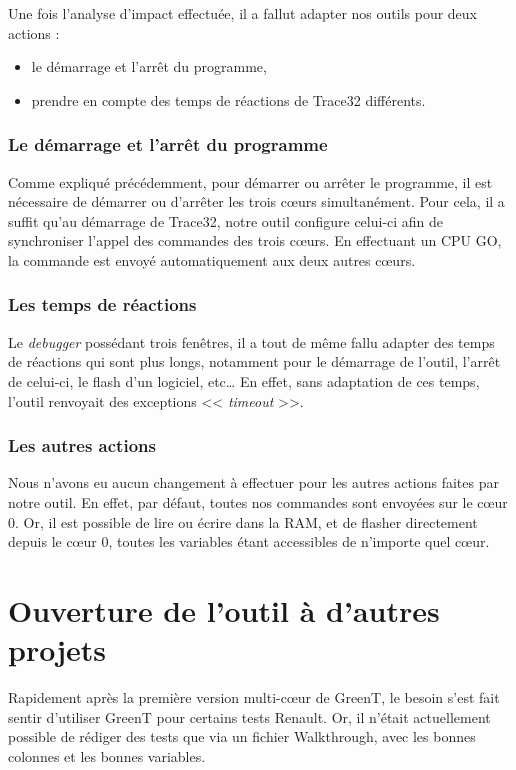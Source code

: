 Une fois l'analyse d'impact effectuée, il a fallut adapter nos outils pour deux actions : 
\begin{itemize}
	\item le démarrage et l'arrêt du programme,
	\item prendre en compte des temps de réactions de Trace32 différents.
\end{itemize} 

\subsubsection{Le démarrage et l'arrêt du programme}
Comme expliqué précédemment, pour démarrer ou arrêter le programme, il est nécessaire de démarrer ou d'arrêter les trois cœurs simultanément. Pour cela, il a suffit qu'au démarrage de Trace32, notre outil configure celui-ci afin de synchroniser l'appel des commandes des trois cœurs. En effectuant un CPU GO, la commande est envoyé automatiquement aux deux autres cœurs.

\subsubsection{Les temps de réactions}
Le \textit{debugger} possédant trois fenêtres, il a tout de même fallu adapter des temps de réactions qui sont plus longs, notamment pour le démarrage de l'outil, l'arrêt de celui-ci, le flash d'un logiciel, etc… En effet, sans adaptation de ces temps, l'outil renvoyait des exceptions << \textit{timeout} >>.

\subsubsection{Les autres actions}
Nous n'avons eu aucun changement à effectuer pour les autres actions faites par notre outil. En effet, par défaut, toutes nos commandes sont envoyées sur le cœur 0. Or, il est possible de lire ou écrire dans la RAM, et de flasher directement depuis le cœur 0, toutes les variables étant accessibles de n'importe quel cœur. 

\section{Ouverture de l'outil à d'autres projets} \label{gttestplan}
Rapidement après la première version multi-cœur de GreenT, le besoin s'est fait sentir d'utiliser GreenT pour certains tests Renault. Or, il n'était actuellement possible de rédiger des tests que via un fichier Walkthrough, avec les bonnes colonnes et les bonnes variables. 

